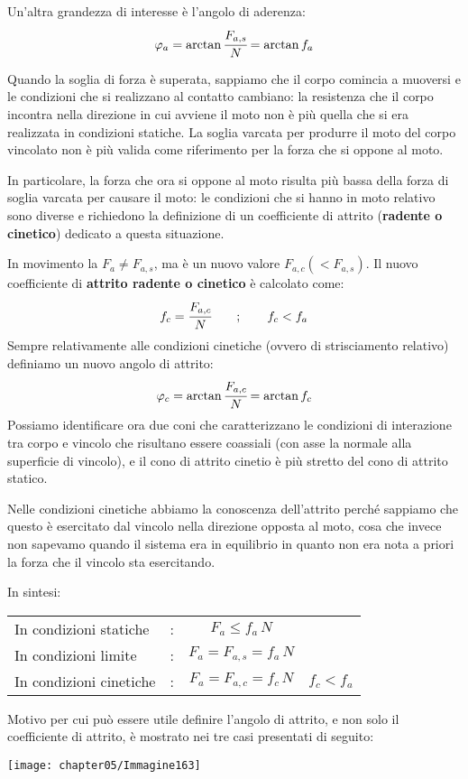 Un'altra grandezza di interesse è l'angolo di aderenza:
\[\varphi_a = \arctan{\cfrac{F_{a,s}}{N}} = \arctan{f_a}\]

 Quando la soglia di forza è superata, sappiamo che il corpo comincia a muoversi e le condizioni che si realizzano al contatto cambiano: la resistenza che il corpo incontra nella direzione in cui avviene il moto non è più quella che si era realizzata in condizioni statiche. La soglia varcata per produrre il moto del corpo vincolato non è più valida come riferimento per la forza che si oppone al moto.
 
 In particolare, la forza che ora si oppone al moto risulta più bassa della forza di soglia varcata per causare il moto: le condizioni che si hanno in moto relativo sono diverse e richiedono la definizione di un coefficiente di attrito (\textbf{radente o cinetico}) dedicato a questa situazione.
 
 In movimento la $F_a \ne F_{a,s}$, ma è un nuovo valore $F_{a,c} (< F_{a,s})$. Il nuovo coefficiente di \textbf{attrito radente o cinetico} è calcolato come:
 \[f_c = \cfrac{F_{a,c}}{N}\qquad;\qquad f_c < f_a\]
 Sempre relativamente alle condizioni cinetiche (ovvero di strisciamento relativo) definiamo un nuovo angolo di attrito:
 \[\varphi_c = \arctan{\cfrac{F_{a,c}}{N}}=\arctan{f_c}\]
 Possiamo identificare ora due coni che caratterizzano le condizioni di interazione tra corpo e vincolo che risultano essere coassiali (con asse la normale alla superficie di vincolo), e il cono di attrito cinetio è più stretto del cono di attrito statico.
 
 Nelle condizioni cinetiche abbiamo la conoscenza dell'attrito perché sappiamo che questo è esercitato dal vincolo nella direzione opposta al moto, cosa che invece non sapevamo quando il sistema era in equilibrio in quanto non era nota a priori la forza che il vincolo sta esercitando.
 
 In sintesi:
 \vspace{1mm}
 
 \begin{tabular}{llcr}
 In condizioni statiche&:&$F_a \le f_a\,N$&\\
 In condizioni limite&:&$F_{a} = F_{a,s}= f_a\,N$&\\
 In condizioni cinetiche&:&$F_a = F_{a,c} = f_c\,N$&$f_c < f_a$
 \end{tabular}

Motivo per cui può essere utile definire l'angolo di attrito, e non solo il coefficiente di attrito, è mostrato nei tre casi presentati di seguito:
\begin{center}
\texttt{[image: chapter05/Immagine163]}
\end{center}


